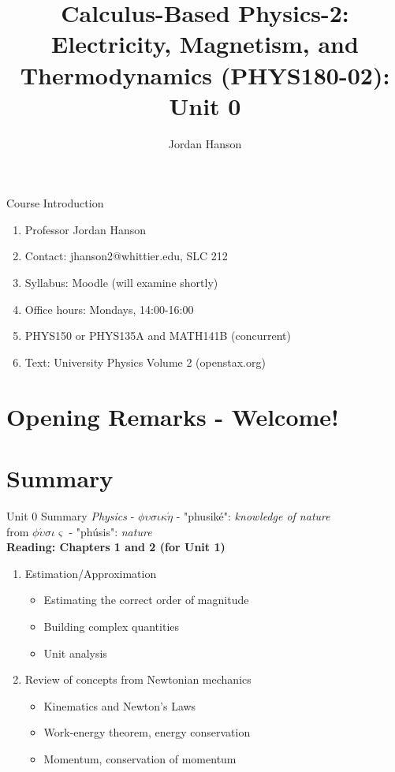 \documentclass{beamer}
\title{Calculus-Based Physics-2: Electricity, Magnetism, and Thermodynamics (PHYS180-02): Unit 0}
\author{Jordan Hanson}
\institute{Whittier College Department of Physics and Astronomy}
\begin{document}
\maketitle

\begin{frame}{Course Introduction}
\begin{enumerate}
\item Professor Jordan Hanson
\item Contact: jhanson2@whittier.edu, SLC 212
\item Syllabus: Moodle (will examine shortly)
\item Office hours: Mondays, 14:00-16:00
\item PHYS150 or PHYS135A and MATH141B (concurrent)
\item Text: University Physics Volume 2 (openstax.org)
\end{enumerate}
\end{frame}

\section{Opening Remarks - Welcome!}

\section{Summary}

\begin{frame}{Unit 0 Summary}
\textit{Physics} - $\phi\upsilon\sigma\iota\kappa\acute{\eta}$ - "phusik\'e": \textit{knowledge of nature} \\
from $\phi\acute{\upsilon}\sigma\iota\varsigma$ - "ph\'usis": \textit{nature} \\
\textbf{Reading: Chapters 1 and 2 (for Unit 1)}
\begin{enumerate}
\item Estimation/Approximation
\begin{itemize}
\item \alert{Estimating} the correct order of magnitude
\item \alert{Building} complex quantities
\item \alert{Unit analysis}
\end{itemize}
\item Review of concepts from Newtonian mechanics
\begin{itemize}
\item Kinematics and \alert{Newton's Laws}
\item Work-energy theorem, energy conservation
\item Momentum, conservation of momentum
\end{itemize}
\end{enumerate}
\end{frame}
\end{document}
